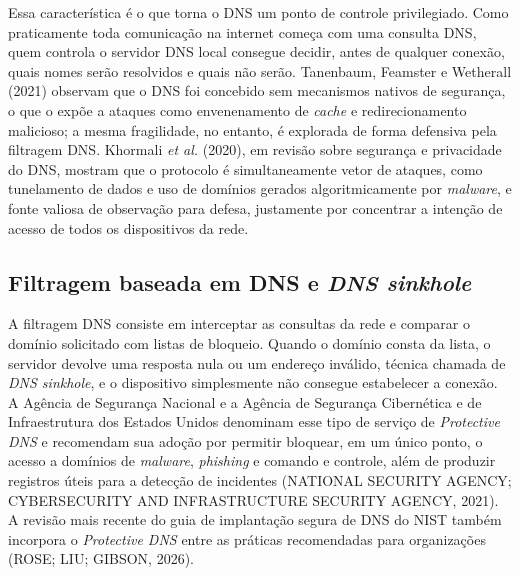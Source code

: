 \documentclass[12pt,a4paper]{article}
\begin{document}
Essa característica é o que torna o DNS um ponto de controle privilegiado. Como praticamente toda comunicação na internet começa com uma consulta DNS, quem controla o servidor DNS local consegue decidir, antes de qualquer conexão, quais nomes serão resolvidos e quais não serão. Tanenbaum, Feamster e Wetherall (2021) observam que o DNS foi concebido sem mecanismos nativos de segurança, o que o expõe a ataques como envenenamento de \textit{cache} e redirecionamento malicioso; a mesma fragilidade, no entanto, é explorada de forma defensiva pela filtragem DNS. Khormali \textit{et al.} (2020), em revisão sobre segurança e privacidade do DNS, mostram que o protocolo é simultaneamente vetor de ataques, como tunelamento de dados e uso de domínios gerados algoritmicamente por \textit{malware}, e fonte valiosa de observação para defesa, justamente por concentrar a intenção de acesso de todos os dispositivos da rede.

\subsection{Filtragem baseada em DNS e \textit{DNS sinkhole}}
A filtragem DNS consiste em interceptar as consultas da rede e comparar o domínio solicitado com listas de bloqueio. Quando o domínio consta da lista, o servidor devolve uma resposta nula ou um endereço inválido, técnica chamada de \textit{DNS sinkhole}, e o dispositivo simplesmente não consegue estabelecer a conexão. A Agência de Segurança Nacional e a Agência de Segurança Cibernética e de Infraestrutura dos Estados Unidos denominam esse tipo de serviço de \textit{Protective DNS} e recomendam sua adoção por permitir bloquear, em um único ponto, o acesso a domínios de \textit{malware}, \textit{phishing} e comando e controle, além de produzir registros úteis para a detecção de incidentes (NATIONAL SECURITY AGENCY; CYBERSECURITY AND INFRASTRUCTURE SECURITY AGENCY, 2021). A revisão mais recente do guia de implantação segura de DNS do NIST também incorpora o \textit{Protective DNS} entre as práticas recomendadas para organizações (ROSE; LIU; GIBSON, 2026).
\end{document}

